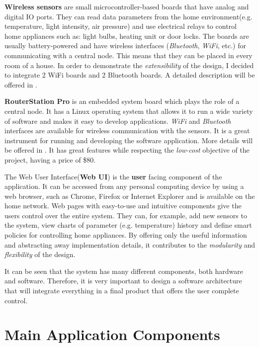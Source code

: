 
\textbf{Wireless sensors} are small microcontroller-based boards that have analog and digital IO ports. They can read data parameters from the home environment(e.g. temperature, light intensity, air pressure) and use electrical relays to control home appliances such as: light bulbs, heating unit or door locks. The boards are usually battery-powered and have wireless interfaces (\textit{Bluetooth}, \textit{WiFi}, etc.) for communicating with a central node. This means that they can be placed in every room of a house. In order to demonstrate the \textit{extensibility} of the design, I decided to integrate 2 WiFi boards and 2 Bluetooth boards. A detailed description will be offered in . 

\textbf{RouterStation Pro} is an embedded system board which plays the role of a central node. It has a Linux operating system that allows it to run a wide variety of software and makes it easy to develop applications. \textit{WiFi} and \textit{Bluetooth} interfaces are available for wireless communication with the sensors. It is a great instrument for running and developing the software application. More details will be offered in . It has great features while respecting the \textit{low-cost} objective of the project, having a price of \$80.

The Web User Interface(\textbf{Web UI}) is the \textbf{user} facing component of the application. It can be accessed from any personal computing device by using a web browser, such as Chrome, Firefox or Internet Explorer and is available on the home network. Web pages with easy-to-use and intuitive components give the users control over the entire system. They can, for example, add new sensors to the system, view charts of parameter (e.g. temperature) history and define smart policies for controlling home appliances. By offering only the useful information and abstracting away implementation details, it contributes to the \textit{modularity} and \textit{flexibility} of the design.

It can be seen that the system has many different components, both hardware and software. Therefore, it is very important to design a software architecture that will integrate everything in a final product that offers the user complete control.

\section{Main Application Components}

